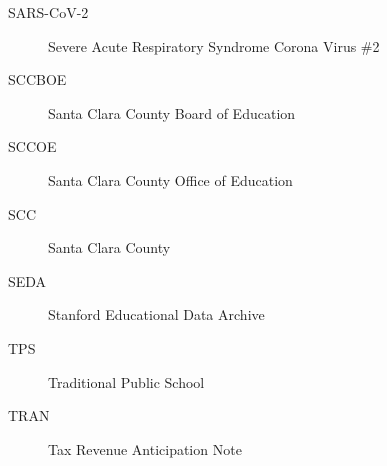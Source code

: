 \begin{description}
  \item[SARS-CoV-2] Severe Acute Respiratory Syndrome Corona Virus \#2
  \item[SCCBOE] Santa Clara County Board of Education
  \item[SCCOE] Santa Clara County Office of Education
  \item[SCC] Santa Clara County
  \item[SEDA] Stanford Educational Data Archive
  \item[TPS] Traditional Public School
  \item[TRAN] Tax Revenue Anticipation Note
\end{description}

